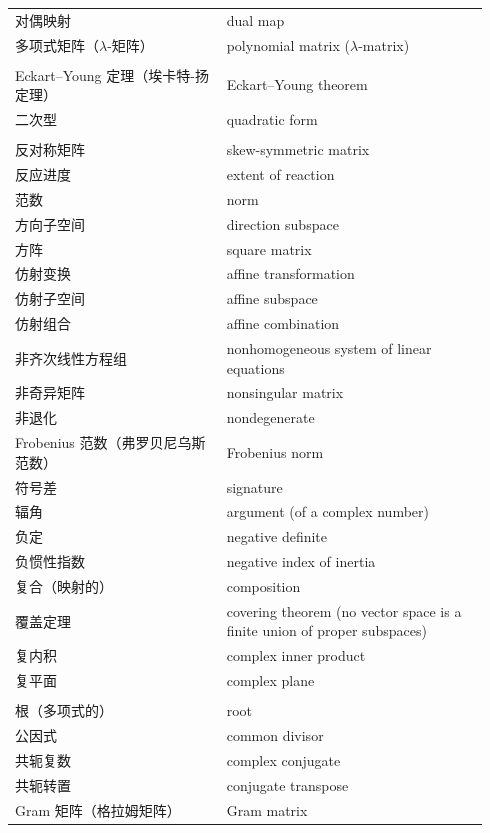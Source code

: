 {\begin{longtable}{p{0.42\linewidth}p{0.52\linewidth}}
		对偶映射 & dual map \\
		多项式矩阵（$\lambda$-矩阵） & polynomial matrix ($\lambda$-matrix) \\
		\addlinespace
		\multicolumn{2}{l}{\textbf{\sffamily E}} \\
		Eckart–Young 定理（埃卡特-扬定理） & Eckart–Young theorem \\
		二次型 & quadratic form \\
		\addlinespace
		\multicolumn{2}{l}{\textbf{\sffamily F}} \\
		反对称矩阵 & skew-symmetric matrix \\
		反应进度 & extent of reaction \\
		范数 & norm \\
		方向子空间 & direction subspace \\
		方阵 & square matrix \\
		仿射变换 & affine transformation \\
		仿射子空间 & affine subspace \\
		仿射组合 & affine combination \\
		非齐次线性方程组 & nonhomogeneous system of linear equations \\
		非奇异矩阵 & nonsingular matrix \\
		非退化 & nondegenerate \\
		Frobenius 范数（弗罗贝尼乌斯范数） & Frobenius norm \\
		符号差 & signature \\
		辐角 & argument (of a complex number) \\
		负定 & negative definite \\
		负惯性指数 & negative index of inertia \\
		复合（映射的） & composition \\
		覆盖定理 & covering theorem (no vector space is a finite union of proper subspaces) \\
		复内积 & complex inner product \\
		复平面 & complex plane \\
		\addlinespace
		\multicolumn{2}{l}{\textbf{\sffamily G}} \\
		根（多项式的） & root \\
		公因式 & common divisor \\
		共轭复数 & complex conjugate \\
		共轭转置 & conjugate transpose \\
		Gram 矩阵（格拉姆矩阵） & Gram matrix \\

\end{longtable}}

